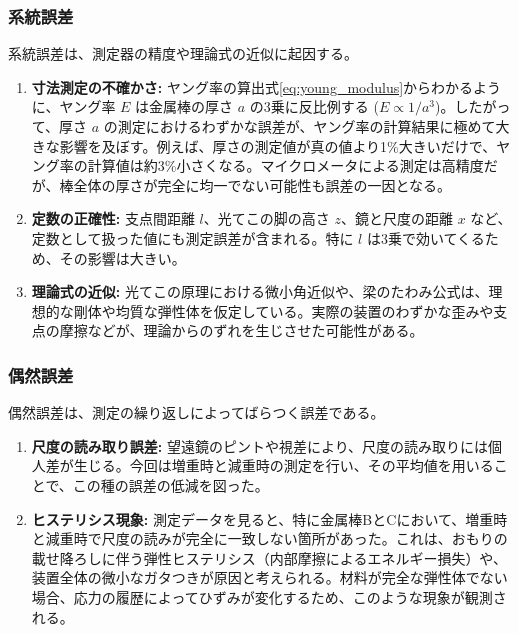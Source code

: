 \documentclass[a4paper,11pt,dvipdfmx]{jsarticle}
\begin{document}
\subsubsection{系統誤差}
系統誤差は、測定器の精度や理論式の近似に起因する。
\begin{enumerate}
    \item \textbf{寸法測定の不確かさ:} ヤング率の算出式\eqref{eq:young_modulus}からわかるように、ヤング率 $E$ は金属棒の厚さ $a$ の3乗に反比例する ($E \propto 1/a^3$)。したがって、厚さ $a$ の測定におけるわずかな誤差が、ヤング率の計算結果に極めて大きな影響を及ぼす。例えば、厚さの測定値が真の値より1\%大きいだけで、ヤング率の計算値は約3\%小さくなる。マイクロメータによる測定は高精度だが、棒全体の厚さが完全に均一でない可能性も誤差の一因となる。
    \item \textbf{定数の正確性:} 支点間距離 $l$、光てこの脚の高さ $z$、鏡と尺度の距離 $x$ など、定数として扱った値にも測定誤差が含まれる。特に $l$ は3乗で効いてくるため、その影響は大きい。
    \item \textbf{理論式の近似:} 光てこの原理における微小角近似や、梁のたわみ公式は、理想的な剛体や均質な弾性体を仮定している。実際の装置のわずかな歪みや支点の摩擦などが、理論からのずれを生じさせた可能性がある。
\end{enumerate}

\subsubsection{偶然誤差}
偶然誤差は、測定の繰り返しによってばらつく誤差である。
\begin{enumerate}
    \item \textbf{尺度の読み取り誤差:} 望遠鏡のピントや視差により、尺度の読み取りには個人差が生じる。今回は増重時と減重時の測定を行い、その平均値を用いることで、この種の誤差の低減を図った。
    \item \textbf{ヒステリシス現象:} 測定データを見ると、特に金属棒BとCにおいて、増重時と減重時で尺度の読みが完全に一致しない箇所があった。これは、おもりの載せ降ろしに伴う弾性ヒステリシス（内部摩擦によるエネルギー損失）や、装置全体の微小なガタつきが原因と考えられる。材料が完全な弾性体でない場合、応力の履歴によってひずみが変化するため、このような現象が観測される。
\end{enumerate}
\end{document}
